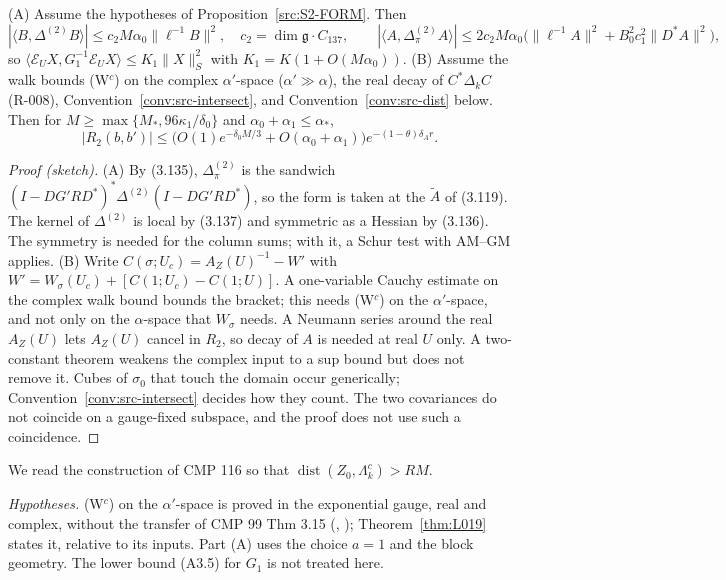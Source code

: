 \begin{proposition}\label{src:S2-G1-V7}
(A) Assume the hypotheses of Proposition~\ref{src:S2-FORM}. Then
\[
|\langle B,\Delta^{(2)}B\rangle|\le c_2M\alpha_0\|\ell^{-1}B\|^2,\quad c_2=\dim\mathfrak g\cdot C_{137},\qquad
|\langle A,\Delta^{(2)}_\pi A\rangle|\le2c_2M\alpha_0\bigl(\|\ell^{-1}A\|^2+B_0^2c_1^2\|D^*A\|^2\bigr),
\]
so $\langle\mathcal E_UX,G_1^{-1}\mathcal E_UX\rangle\le K_1\|X\|_S^2$ with $K_1=K(1+O(M\alpha_0))$.
(B) Assume the walk bounds (W$^c$) on the complex $\alpha'$-space ($\alpha'\gg\alpha$), the real decay of $C^*\Delta_kC$ (R-008), Convention~\ref{conv:src-intersect}, and Convention~\ref{conv:src-dist} below. Then for $M\ge\max\{M_*,96\kappa_1/\delta_0\}$ and $\alpha_0+\alpha_1\le\alpha_*$,
\[
|R_2(b,b')|\le\bigl(O(1)e^{-\delta_0M/3}+O(\alpha_0+\alpha_1)\bigr)e^{-(1-\theta)\delta_A r}.
\]
\end{proposition}
\begin{proof}[Proof (sketch)]
(A) By (3.135), $\Delta^{(2)}_\pi$ is the sandwich $(I-DG'RD^*)^*\Delta^{(2)}(I-DG'RD^*)$, so the form is taken at the $\tilde A$ of (3.119). The kernel of $\Delta^{(2)}$ is local by (3.137) and symmetric as a Hessian by (3.136). The symmetry is needed for the column sums; with it, a Schur test with AM--GM applies.
(B) Write $C(\sigma;U_c)=A_Z(U)^{-1}-W'$ with $W'=W_\sigma(U_c)+[C(1;U_c)-C(1;U)]$. A one-variable Cauchy estimate on the complex walk bound bounds the bracket; this needs (W$^c$) on the $\alpha'$-space, and not only on the $\alpha$-space that $W_\sigma$ needs. A Neumann series around the real $A_Z(U)$ lets $A_Z(U)$ cancel in $R_2$, so decay of $A$ is needed at real $U$ only. A two-constant theorem weakens the complex input to a sup bound but does not remove it. Cubes of $\sigma_0$ that touch the domain occur generically; Convention~\ref{conv:src-intersect} decides how they count. The two covariances do not coincide on a gauge-fixed subspace, and the proof does not use such a coincidence.
\end{proof}

\begin{convention}\label{conv:src-dist}
We read the construction of CMP 116 so that $\operatorname{dist}(Z_0,\Lambda_k^c)>RM$.
\end{convention}

\emph{Hypotheses.} (W$^c$) on the $\alpha'$-space is proved in the exponential gauge, real and complex, without the transfer of CMP 99 Thm 3.15 (, ); Theorem~\ref{thm:L019} states it, relative to its inputs. Part (A) uses the choice $a=1$ and the block geometry. The lower bound (A3.5) for $G_1$ is not treated here.

